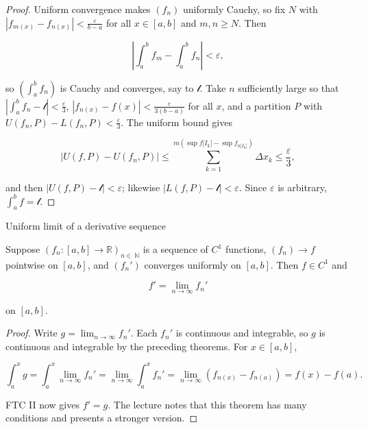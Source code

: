 \begin{proof}

Uniform convergence makes \(\left( f_{n} \right)\) uniformly Cauchy, so fix \(N\) with \(\left| {f_{m{(x)}} - f_{n{(x)}}} \right| < \frac{\varepsilon}{b - a}\) for all \(x \in \left\lbrack {a,b} \right\rbrack\) and \(m,n \geq N\). Then

\[\left| {\int_{a}^{b}f_{m} - \int_{a}^{b}f_{n}} \right| < \varepsilon,\]

so \(\left( {\int_{a}^{b}f_{n}} \right)\) is Cauchy and converges, say to \(\mathcal{l}\). Take \(n\) sufficiently large so that \(\left| {\int_{a}^{b}f_{n} - \mathcal{l}} \right| < \frac{\varepsilon}{3}\), \(\left| {f_{n{(x)}} - f(x)} \right| < \frac{\varepsilon}{3\left( {b - a} \right)}\) for all \(x\), and a partition \(P\) with \(U\left( {f_{n},P} \right) - L\left( {f_{n},P} \right) < \frac{\varepsilon}{3}\). The uniform bound gives

\[\left| {U\left( {f,P} \right) - U\left( {f_{n},P} \right)} \right| \leq \sum\limits_{k = 1}^{m{({\sup f{\lbrack I_{k}\rbrack} - \sup f_{n{\lbrack I_{k}\rbrack}}})}}\Delta x_{k} \leq \frac{\varepsilon}{3},\]

and then \(\left| {U\left( {f,P} \right) - \mathcal{l}} \right| < \varepsilon\); likewise \(\left| {L\left( {f,P} \right) - \mathcal{l}} \right| < \varepsilon\). Since \(\varepsilon\) is arbitrary, \(\int_{a}^{b}f = \mathcal{l}\).

\end{proof}

\begin{theorem}{Uniform limit of a derivative sequence}

Suppose \(\left( {f_{n}:\left\lbrack {a,b} \right\rbrack\rightarrow\mathbb{R}} \right)_{n \in \ \mathbb{N}}\) is a sequence of \(C^{1}\) functions, \(\left( f_{n} \right)\rightarrow f\) pointwise on \(\left\lbrack {a,b} \right\rbrack\), and \(\left( f_{n}' \right)\) converges uniformly on \(\left\lbrack {a,b} \right\rbrack\). Then \(f \in C^{1}\) and

\[f' = \lim\limits_{n\rightarrow\infty}f_{n}'\]

on \(\left\lbrack {a,b} \right\rbrack\).

\end{theorem}

\begin{proof}

Write \(g = \lim_{n\rightarrow\infty}f_{n}'\). Each \(f_{n}'\) is continuous and integrable, so \(g\) is continuous and integrable by the preceding theorems. For \(x \in \left\lbrack {a,b} \right\rbrack\),

\[\int_{a}^{x}g = \int_{a}^{x}\lim\limits_{n\rightarrow\infty}f_{n}' = \lim\limits_{n\rightarrow\infty}\int_{a}^{x}f_{n}' = \lim\limits_{n\rightarrow\infty}\left( {f_{n{(x)}} - f_{n{(a)}}} \right) = f(x) - f(a).\]

FTC II now gives \(f' = g\). The lecture notes that this theorem has many conditions and presents a stronger version.

\end{proof}

